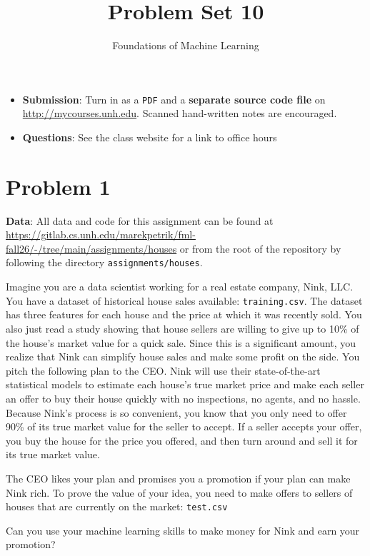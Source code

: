 \documentclass[letterpaper]{article}
\title{Problem Set 10}
\author{Foundations of Machine Learning}
\date{}
\begin{document}
\maketitle

\begin{itemize}
\item \textbf{Submission}: Turn in as a \texttt{PDF} and a \textbf{separate source code file} on \url{http://mycourses.unh.edu}. Scanned hand-written notes are encouraged.
\item \textbf{Questions}: See the class website for a link to office hours
\end{itemize}


\section{Problem 1}

\textbf{Data}: All data and code for this assignment can be found at \url{https://gitlab.cs.unh.edu/marekpetrik/fml-fall26/-/tree/main/assignments/houses} or from the root of the repository by following the directory \texttt{assignments/houses}.

Imagine you are a data scientist working for a real estate company, Nink, LLC. You have a dataset of historical house sales available: \texttt{training.csv}. The dataset has three features for each house and the price at which it was recently sold. You also just read a study showing that house sellers are willing to give up to 10\% of the house's market value for a quick sale. Since this is a significant amount, you realize that Nink can simplify house sales and make some profit on the side. You pitch the following plan to the CEO. Nink will use their state-of-the-art statistical models to estimate each house’s true market price and make each seller an offer to buy their house quickly with no inspections, no agents, and no hassle. Because Nink's process is so convenient, you know that you only need to offer 90\% of its true market value for the seller to accept. If a seller accepts your offer, you buy the house for the price you offered, and then turn around and sell it for its true market value.

The CEO likes your plan and promises you a promotion if your plan can make Nink rich. To prove the value of your idea, you need to make offers to sellers of houses that are currently on the market: \texttt{test.csv}

Can you use your machine learning skills to make money for Nink and earn your promotion?
\end{document}
